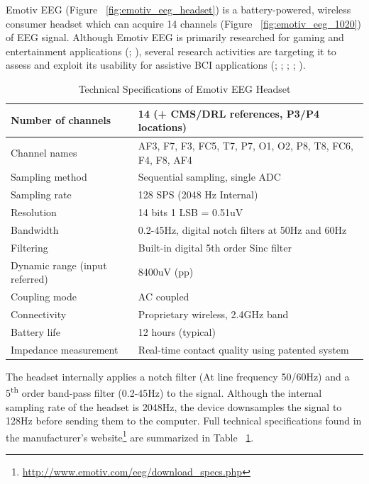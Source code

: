 \documentclass[12pt]{article}
\numberwithin{equation}{section}
\numberwithin{figure}{section}
\numberwithin{table}{section}
\begin{document}
{    Emotiv EEG (Figure ~\ref{fig:emotiv_eeg_headset}) is a battery-powered, wireless consumer headset which can
    acquire 14 channels (Figure ~\ref{fig:emotiv_eeg_1020}) of EEG signal. Although Emotiv EEG is primarily
    researched for gaming and entertainment applications (\citealp{van_vliet_designing_2012}; \citealp{chumerin_steady-state_2013}),
    several research activities are targeting it to assess and exploit its usability for
    assistive BCI applications (\citealp{liu_implementation_2012}; \citealp{badcock_validation_2013}; \citealp{caglayan_humanoid_2013}; \citealp{guneysu_ssvep_2013}; \citealp{choi_low-cost_2013}).
}
\par{
    \begin{table}
        \footnotesize
        \centering
        \caption{Technical Specifications of Emotiv EEG Headset}
        \begin{tabular}{ll}
            \hline
            Number of channels & 14 (+ CMS/DRL references, P3/P4 locations) \\ \hline
            Channel names & AF3, F7, F3, FC5, T7, P7, O1, O2, P8, T8, FC6, F4, F8, AF4 \\ \hline
            Sampling method & Sequential sampling, single ADC \\ \hline
            Sampling rate & 128 SPS (2048 Hz Internal) \\ \hline
            Resolution & 14 bits 1 LSB = 0.51uV \\ \hline
            Bandwidth & 0.2-45Hz, digital notch filters at 50Hz and 60Hz \\ \hline
            Filtering & Built-in digital 5th order Sinc filter \\ \hline
            Dynamic range (input referred) & 8400uV (pp) \\ \hline
            Coupling mode & AC coupled \\ \hline
            Connectivity & Proprietary wireless, 2.4GHz band \\ \hline
            Battery life & 12 hours (typical) \\ \hline
            Impedance measurement & Real-time contact quality using patented system \\ \hline
        \end{tabular}
        \label{table:emotiv_eeg_specs}
    \end{table}
    The headset internally applies a
    notch filter (At line frequency 50/60Hz) and a 5\textsuperscript{th} order band-pass filter (0.2-45Hz)
    to the signal. Although the internal sampling rate of the headset is 2048Hz, the device
    downsamples the signal to 128Hz before sending them to the computer. Full technical specifications found in the
    manufacturer's website\footnote{\url{http://www.emotiv.com/eeg/download_specs.php}} are summarized in Table ~\ref{table:emotiv_eeg_specs}.
}
\end{document}
